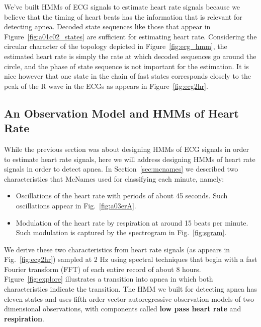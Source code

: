 We've built HMMs of ECG signals to estimate heart rate signals because
we believe that the timing of heart beats has the information that is
relevant for detecting apnea.  Decoded state sequences like those that
appear in Figure~\ref{fig:a01c02_states} are sufficient for estimating
heart rate.  Considering the circular character of the topology
depicted in Figure~\ref{fig:ecg_hmm}, the estimated heart rate is
simply the rate at which decoded sequences go around the circle, and
the phase of state sequence is not important for the estimation.  It
is nice however that one state in the chain of fast states corresponds
closely to the peak of the R wave in the ECGs as appears in
Figure~\ref{fig:ecg2hr}.

\afterpage{\clearpage}%

\subsection{An Observation Model and HMMs of Heart Rate}
\label{sec:apnea_observation_model}

While the previous section was about designing HMMs of ECG signals in
order to estimate heart rate signals, here we will address designing
HMMs of heart rate signals in order to detect apnea.  In
Section~\ref{sec:mcnames} we described two characteristics that
McNames used for classifying each minute, namely:
\begin{itemize}
\item Oscillations of the heart rate with periods of about 45 seconds.
  Such oscillations appear in Fig.~\ref{fig:a03erA}.
\item Modulation of the heart rate by respiration at around 15 beats
  per minute. Such modulation is captured by the spectrogram in
  Fig.~\ref{fig:sgram}.
\end{itemize}
We derive these two characteristics from heart rate signals (as appears
in Fig.~\ref{fig:ecg2hr}) sampled at 2 Hz using spectral techniques
that begin with a fast Fourier transform (FFT) of each entire record
of about 8 hours.  Figure~\ref{fig:explore} illustrates a transition into apnea
in which both characteristics indicate the transition.  The HMM we
built for detecting apnea has eleven states and uses fifth
order vector autoregressive observation models of two dimensional
observations, with components called \textbf{low pass heart rate} and
\textbf{respiration}.

